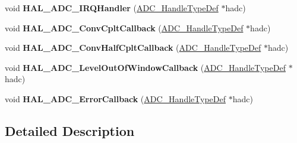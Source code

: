 \begin{DoxyCompactItemize}
void {\bfseries H\+A\+L\+\_\+\+A\+D\+C\+\_\+\+I\+R\+Q\+Handler} (\hyperlink{struct_a_d_c___handle_type_def}{A\+D\+C\+\_\+\+Handle\+Type\+Def} $\ast$hadc)
\item 
\mbox{\label{group___a_d_c___exported___functions___group2_gaf20a88180db1113be1e89266917d148b}} 
void {\bfseries H\+A\+L\+\_\+\+A\+D\+C\+\_\+\+Conv\+Cplt\+Callback} (\hyperlink{struct_a_d_c___handle_type_def}{A\+D\+C\+\_\+\+Handle\+Type\+Def} $\ast$hadc)
\item 
\mbox{\label{group___a_d_c___exported___functions___group2_gad7e3dafc08886b97b9c9e23267645b9e}} 
void {\bfseries H\+A\+L\+\_\+\+A\+D\+C\+\_\+\+Conv\+Half\+Cplt\+Callback} (\hyperlink{struct_a_d_c___handle_type_def}{A\+D\+C\+\_\+\+Handle\+Type\+Def} $\ast$hadc)
\item 
\mbox{\label{group___a_d_c___exported___functions___group2_ga8cf5c59c6355fe7cf3c10816c761b9c2}} 
void {\bfseries H\+A\+L\+\_\+\+A\+D\+C\+\_\+\+Level\+Out\+Of\+Window\+Callback} (\hyperlink{struct_a_d_c___handle_type_def}{A\+D\+C\+\_\+\+Handle\+Type\+Def} $\ast$hadc)
\item 
\mbox{\label{group___a_d_c___exported___functions___group2_gadea1a55c5199d5cb4cfc1fdcd32be1b2}} 
void {\bfseries H\+A\+L\+\_\+\+A\+D\+C\+\_\+\+Error\+Callback} (\hyperlink{struct_a_d_c___handle_type_def}{A\+D\+C\+\_\+\+Handle\+Type\+Def} $\ast$hadc)
\end{DoxyCompactItemize}


\subsection{Detailed Description}
